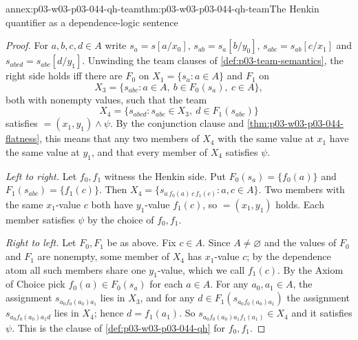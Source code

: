 \begin{annexitem}{annex:p03-w03-p03-044-qh-team}{thm:p03-w03-p03-044-qh-team}{The Henkin quantifier as a dependence-logic sentence}
\begin{proof}
For \(a,b,c,d\in A\) write
\(s_{a}=s[a/x_0]\), \(s_{ab}=s_a[b/y_0]\), \(s_{abc}=s_{ab}[c/x_1]\) and
\(s_{abcd}=s_{abc}[d/y_1]\).  Unwinding the team clauses of
\cref{def:p03-team-semantics}, the right side holds iff there are
\(F_0\) on \(X_1=\{s_a:a\in A\}\) and \(F_1\) on
\[
 X_3=\{s_{abc}:a\in A,\ b\in F_0(s_a),\ c\in A\},
\]
both with nonempty values, such that the team
\[
 X_4=\{s_{abcd}:s_{abc}\in X_3,\ d\in F_1(s_{abc})\}
\]
satisfies \(=(x_1,y_1)\land\psi\).  By the conjunction clause and
\cref{thm:p03-w03-p03-044-flatness}, this means that any two members of
\(X_4\) with the same value at \(x_1\) have the same value at \(y_1\), and
that every member of \(X_4\) satisfies \(\psi\).

\emph{Left to right.}  Let \(f_0,f_1\) witness the Henkin side.  Put
\(F_0(s_a)=\{f_0(a)\}\) and \(F_1(s_{abc})=\{f_1(c)\}\).  Then
\(X_4=\{s_{a\,f_0(a)\,c\,f_1(c)}:a,c\in A\}\).  Two members with the same
\(x_1\)-value \(c\) both have \(y_1\)-value \(f_1(c)\), so \(=(x_1,y_1)\)
holds.  Each member satisfies \(\psi\) by the choice of \(f_0,f_1\).

\emph{Right to left.}  Let \(F_0,F_1\) be as above.  Fix \(c\in A\).  Since
\(A\neq\varnothing\) and the values of \(F_0\) and \(F_1\) are nonempty,
some member of \(X_4\) has \(x_1\)-value \(c\); by the dependence atom all
such members share one \(y_1\)-value, which we call \(f_1(c)\).  By the
Axiom of Choice pick \(f_0(a)\in F_0(s_a)\) for each \(a\in A\).  For any
\(a_0,a_1\in A\), the assignment \(s_{a_0f_0(a_0)a_1}\) lies in \(X_3\), and
for any \(d\in F_1(s_{a_0f_0(a_0)a_1})\) the assignment
\(s_{a_0f_0(a_0)a_1d}\) lies in \(X_4\); hence \(d=f_1(a_1)\).  So
\(s_{a_0f_0(a_0)a_1f_1(a_1)}\in X_4\) and it satisfies \(\psi\).  This is
the clause of \cref{def:p03-w03-p03-044-qh} for \(f_0,f_1\).
\end{proof}
\end{annexitem}
